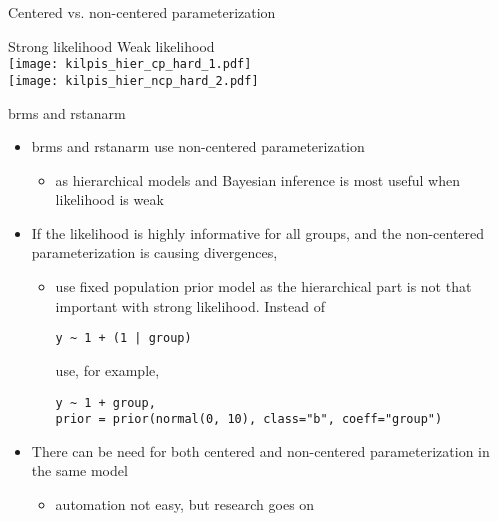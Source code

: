 \documentclass[finnish,english,t]{beamer}
\begin{document}
\begin{frame}[fragile]{Centered vs. non-centered parameterization}

  \vspace{-1\baselineskip}
  \hspace{15mm} Strong likelihood \hspace{14mm} Weak likelihood\\
  {\texttt{[image: kilpis\_hier\_cp\_hard\_1.pdf]}}\\
  {\texttt{[image: kilpis\_hier\_ncp\_hard\_2.pdf]}}\\
  \vspace{-80mm}
  
\end{frame}

\begin{frame}[fragile]{brms and rstanarm}

  \begin{itemize}
  \item<+-> brms and rstanarm use non-centered parameterization
    \begin{itemize}
    \item as hierarchical models and Bayesian inference is most useful
      when likelihood is weak
    \end{itemize}
  \item<+-> If the likelihood is highly informative for all groups, and
    the non-centered parameterization is causing divergences,
    \begin{itemize}
    \item use fixed population prior model as the hierarchical part is not
      that important with strong likelihood. Instead of 
\begin{verbatim}
y ~ 1 + (1 | group)
\end{verbatim}
      use, for example, 
\begin{verbatim}
y ~ 1 + group,
prior = prior(normal(0, 10), class="b", coeff="group")
\end{verbatim}
    \end{itemize}
  \item<+-> There can be need for both centered and non-centered
    parameterization in the same model
    \begin{itemize}
    \item automation not easy, but research goes on
    \end{itemize}
  \end{itemize}
\end{frame}
\end{document}
